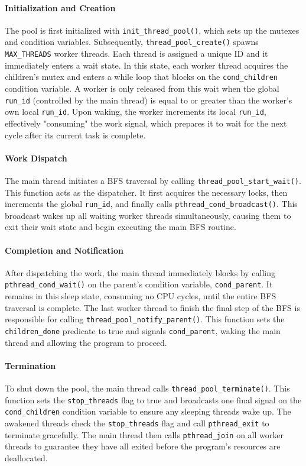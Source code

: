 \paragraph{Initialization and Creation} The pool is first initialized with \texttt{init\_thread\_pool()}, which sets up the mutexes and condition variables. Subsequently, \texttt{thread\_pool\_create()} spawns \texttt{MAX\_THREADS} worker threads. Each thread is assigned a unique ID and it immediately enters a wait state. In this state, each worker thread acquires the children's mutex and enters a while loop that blocks on the \texttt{cond\_children} condition variable. A worker is only released from this wait when the global \texttt{run\_id} (controlled by the main thread) is equal to or greater than the worker's own local \texttt{run\_id}. Upon waking, the worker increments its local \texttt{run\_id}, effectively "consuming" the work signal, which prepares it to wait for the next cycle after its current task is complete.

\paragraph{Work Dispatch} The main thread initiates a BFS traversal by calling \texttt{thread\_pool\_start\_wait()}. This function acts as the dispatcher. It first acquires the necessary locks, then increments the global \texttt{run\_id}, and finally calls \texttt{pthread\_cond\_broadcast()}. This broadcast wakes up all waiting worker threads simultaneously, causing them to exit their wait state and begin executing the main BFS routine.

\paragraph{Completion and Notification} After dispatching the work, the main thread immediately blocks by calling \texttt{pthread\_cond\_wait()} on the parent's condition variable, \texttt{cond\_parent}. It remains in this sleep state, consuming no CPU cycles, until the entire BFS traversal is complete. The last worker thread to finish the final step of the BFS is responsible for calling \texttt{thread\_pool\_notify\_parent()}. This function sets the \texttt{children\_done} predicate to true and signals \texttt{cond\_parent}, waking the main thread and allowing the program to proceed.

\paragraph{Termination} To shut down the pool, the main thread calls \texttt{thread\_pool\_terminate()}. This function sets the \texttt{stop\_threads} flag to true and broadcasts one final signal on the \texttt{cond\_children} condition variable to ensure any sleeping threads wake up. The awakened threads check the \texttt{stop\_threads} flag and call \texttt{pthread\_exit} to terminate gracefully. The main thread then calls \texttt{pthread\_join} on all worker threads to guarantee they have all exited before the program's resources are deallocated.


